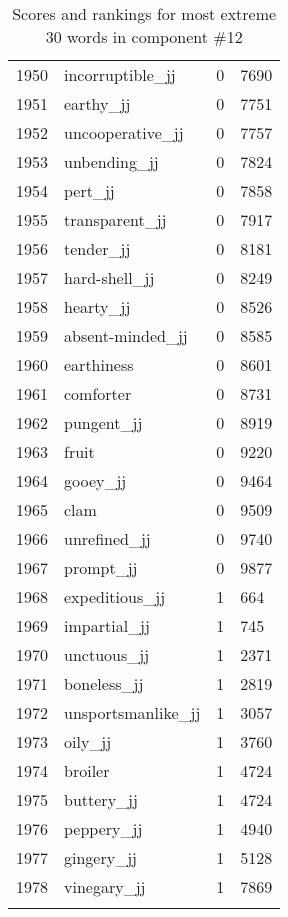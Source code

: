 \begin{longtable}[!htbp]{| rlr@{.}l |}
    1950 & incorruptible\_jj & 0 & 7690 \\
    1951 & earthy\_jj & 0 & 7751 \\
    1952 & uncooperative\_jj & 0 & 7757 \\
    1953 & unbending\_jj & 0 & 7824 \\
    1954 & pert\_jj & 0 & 7858 \\
    1955 & transparent\_jj & 0 & 7917 \\
    1956 & tender\_jj & 0 & 8181 \\
    1957 & hard-shell\_jj & 0 & 8249 \\
    1958 & hearty\_jj & 0 & 8526 \\
    1959 & absent-minded\_jj & 0 & 8585 \\
    1960 & earthiness & 0 & 8601 \\
    1961 & comforter & 0 & 8731 \\
    1962 & pungent\_jj & 0 & 8919 \\
    1963 & fruit & 0 & 9220 \\
    1964 & gooey\_jj & 0 & 9464 \\
    1965 & clam & 0 & 9509 \\
    1966 & unrefined\_jj & 0 & 9740 \\
    1967 & prompt\_jj & 0 & 9877 \\
    1968 & expeditious\_jj & 1 & 664 \\
    1969 & impartial\_jj & 1 & 745 \\
    1970 & unctuous\_jj & 1 & 2371 \\
    1971 & boneless\_jj & 1 & 2819 \\
    1972 & unsportsmanlike\_jj & 1 & 3057 \\
    1973 & oily\_jj & 1 & 3760 \\
    1974 & broiler & 1 & 4724 \\
    1975 & buttery\_jj & 1 & 4724 \\
    1976 & peppery\_jj & 1 & 4940 \\
    1977 & gingery\_jj & 1 & 5128 \\
    1978 & vinegary\_jj & 1 & 7869 \\
    \hline
    \caption{Scores and rankings for most extreme 30 words in component \#12} \\
\end{longtable}
